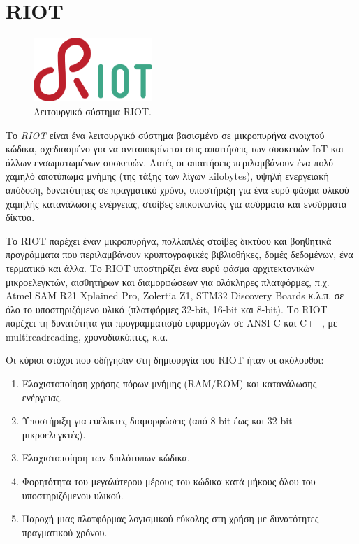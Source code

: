 \section{RIOT}
\label{sec:riot}

\begin{figure}[!ht]
	\centering
	\includegraphics[width=0.4\textwidth]{./images/chapter4/riot.png}
	\caption[Λειτουργικό σύστημα RIOT.]{Λειτουργικό σύστημα RIOT.\footnotemark}
	\label{fig:riot}
\end{figure}


Το \textit{RIOT} \cite{bib:riot} είναι ένα λειτουργικό σύστημα βασισμένο σε μικροπυρήνα ανοιχτού κώδικα, σχεδιασμένο για να ανταποκρίνεται στις απαιτήσεις των συσκευών IoT και άλλων ενσωματωμένων συσκευών. Αυτές οι απαιτήσεις περιλαμβάνουν ένα πολύ χαμηλό αποτύπωμα μνήμης (της τάξης των λίγων kilobytes), υψηλή ενεργειακή απόδοση, δυνατότητες σε πραγματικό χρόνο, υποστήριξη για ένα ευρύ φάσμα υλικού χαμηλής κατανάλωσης ενέργειας, στοίβες επικοινωνίας για ασύρματα και ενσύρματα δίκτυα.

Το RIOT παρέχει έναν μικροπυρήνα, πολλαπλές στοίβες δικτύου και βοηθητικά προγράμματα που περιλαμβάνουν κρυπτογραφικές βιβλιοθήκες, δομές δεδομένων, ένα τερματικό και άλλα. Το RIOT υποστηρίζει ένα ευρύ φάσμα αρχιτεκτονικών μικροελεγκτών, αισθητήρων και διαμορφώσεων για ολόκληρες πλατφόρμες, π.χ. Atmel SAM R21 Xplained Pro, Zolertia Z1, STM32 Discovery Boards κ.λ.π. σε όλο το υποστηριζόμενο υλικό (πλατφόρμες 32-bit, 16-bit και 8-bit). Το RIOT παρέχει τη δυνατότητα για προγραμματισμό εφαρμογών σε ANSI C και C++, με multireadreading, χρονοδιακόπτες, κ.α.

\noindent Οι κύριοι στόχοι που οδήγησαν στη δημιουργία του RIOT ήταν οι ακόλουθοι:

\begin{enumerate}
	\item Ελαχιστοποίηση χρήσης πόρων μνήμης (RAM/ROM) και κατανάλωσης ενέργειας.
	\item Υποστήριξη για ευέλικτες διαμορφώσεις (από 8-bit έως και 32-bit μικροελεγκτές).
	\item Ελαχιστοποίηση των διπλότυπων κώδικα.
	\item Φορητότητα του μεγαλύτερου μέρους του κώδικα κατά μήκους όλου του υποστηριζόμενου υλικού.
	\item Παροχή μιας πλατφόρμας λογισμικού εύκολης στη χρήση με δυνατότητες πραγματικού χρόνου.
\end{enumerate}

